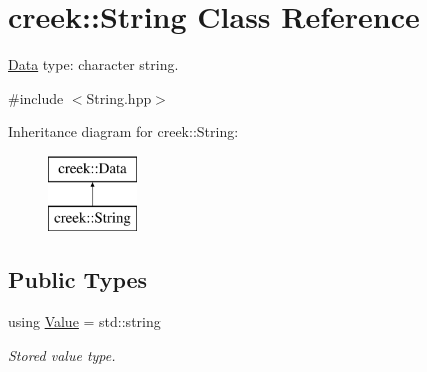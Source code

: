 \hypertarget{classcreek_1_1_string}{}\section{creek\+:\+:String Class Reference}
\label{classcreek_1_1_string}


\hyperlink{classcreek_1_1_data}{Data} type\+: character string.  




{\ttfamily \#include $<$String.\+hpp$>$}

Inheritance diagram for creek\+:\+:String\+:\begin{figure}[H]
\begin{center}
\leavevmode
\includegraphics[height=2.000000cm]{classcreek_1_1_string}
\end{center}
\end{figure}
\subsection*{Public Types}
\begin{DoxyCompactItemize}
\item 
using \hyperlink{classcreek_1_1_string_a1bdb539e8a99ae376aa43e64004ab9ca}{Value} = std\+::string\hypertarget{classcreek_1_1_string_a1bdb539e8a99ae376aa43e64004ab9ca}{}\label{classcreek_1_1_string_a1bdb539e8a99ae376aa43e64004ab9ca}

\begin{DoxyCompactList}\small\item\em Stored value type. \end{DoxyCompactList}\end{DoxyCompactItemize}
